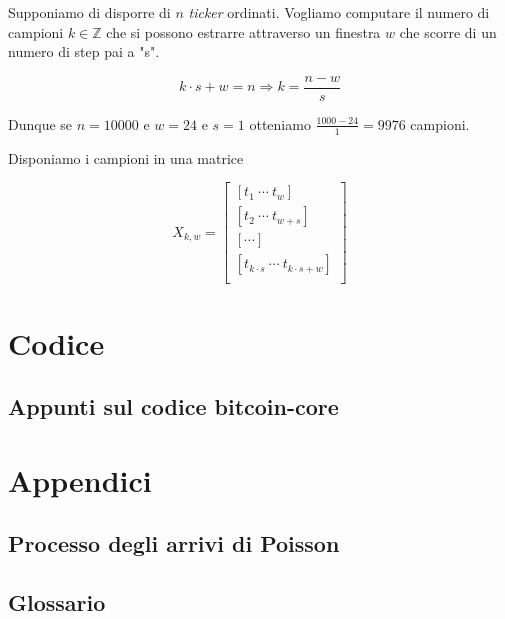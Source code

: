 \documentclass{book}
\theoremstyle{definition}
\begin{document}
Supponiamo di disporre di $n$ \textit{ticker} ordinati.
Vogliamo computare il numero di campioni $k \in \mathbb{Z}$ che si possono estrarre attraverso un finestra $w$ che scorre di un numero di step pai a "s".

\[
    k \cdot s + w = n \Rightarrow k = \frac{n - w}{s}
\]

Dunque se $n = 10000$ e $w = 24$ e $s = 1$ otteniamo $\frac{1000 - 24}{1} = 9976$ campioni.

Disponiamo i campioni in una matrice

\begin{equation*}
    X_{k,w} = 
    \begin{bmatrix}
        [ t_{1} \ \cdots \ t_{w} ] \\
        [ t_{2} \ \cdots \ t_{ w + s} ] \\
        [ \cdots ]\\
        [ t_{k \cdot s} \ \cdots \ t_{ k \cdot s + w } ] \\
    \end{bmatrix}
\end{equation*}

\newpage
\part{Codice}

\chapter{Appunti sul codice bitcoin-core}

\newpage

\part{Appendici}
\appendix
\chapter{Processo degli arrivi di Poisson}

\newpage
\chapter{Glossario}

\newpage


\end{document}
